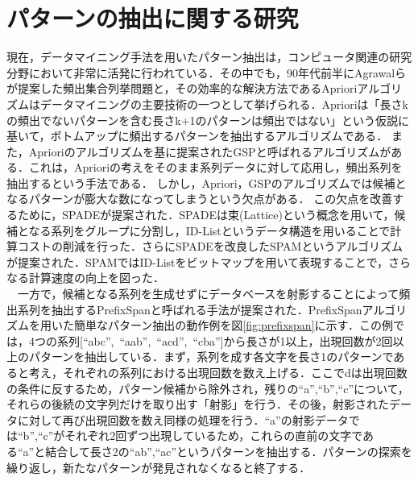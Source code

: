 \documentclass[12pt,twoside, fleqn]{ujbook}
\begin{document}
\section{パターンの抽出に関する研究}
現在，データマイニング手法を用いたパターン抽出は，コンピュータ関連の研究分野において非常に活発に行われている．その中でも，90年代前半にAgrawalらが提案した頻出集合列挙問題\cite{Agrawal:1993:MAR:170036.170072}と，その効率的な解決方法であるAprioriアルゴリズム\cite{Agrawal:1994:FAM:645920.672836}はデータマイニングの主要技術の一つとして挙げられる．Aprioriは「長さkの頻出でないパターンを含む長さk+1のパターンは頻出ではない」という仮説に基いて，ボトムアップに頻出するパターンを抽出するアルゴリズムである．
また，Aprioriのアルゴリズムを基に提案されたGSP\cite{Srikant:1996:MSP:645337.650382}と呼ばれるアルゴリズムがある．これは，Aprioriの考えをそのまま系列データに対して応用し，頻出系列を抽出するという手法である．
しかし，Apriori，GSPのアルゴリズムでは候補となるパターンが膨大な数になってしまうという欠点がある．
この欠点を改善するために，SPADE\cite{Zaki:2001:SEA:599609.599626}が提案された．SPADEは束(Lattice)という概念を用いて，候補となる系列をグループに分割し，ID-Listというデータ構造を用いることで計算コストの削減を行った．さらにSPADEを改良したSPAM\cite{citeulike:3407300}というアルゴリズムが提案された．SPAMではID-Listをビットマップを用いて表現することで，さらなる計算速度の向上を図った．\\
　一方で，候補となる系列を生成せずにデータベースを射影することによって頻出系列を抽出するPrefixSpan\cite{2001:PMS:876881.879716}と呼ばれる手法が提案された．PrefixSpanアルゴリズムを用いた簡単なパターン抽出の動作例を図\ref{fig:prefixspan}に示す．この例では，4つの系列[``abc'',\ ``aab'',\ ``acd'',\ ``cba'']から長さが1以上，出現回数が2回以上のパターンを抽出している．まず，系列を成す各文字を長さ1のパターンであると考え，それぞれの系列における出現回数を数え上げる．ここでdは出現回数の条件に反するため，パターン候補から除外され，残りの``a'',``b'',``c''について，それらの後続の文字列だけを取り出す「射影」を行う．その後，射影されたデータに対して再び出現回数を数え同様の処理を行う．``a''の射影データでは``b'',``c''がそれぞれ2回ずつ出現しているため，これらの直前の文字である``a''と結合して長さ2の``ab'',``ac''というパターンを抽出する．パターンの探索を繰り返し，新たなパターンが発見されなくなると終了する．\\
\end{document}
